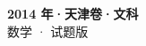 \documentclass[zihao=-4, a4paper]{ctexart}
\begin{document}
\begin{center}
  {\Large\bfseries 2014 年·天津卷·文科}\\[4pt]
  {\large 数学 · 试题版}
\end{center}
\medskip
{}

\end{document}
